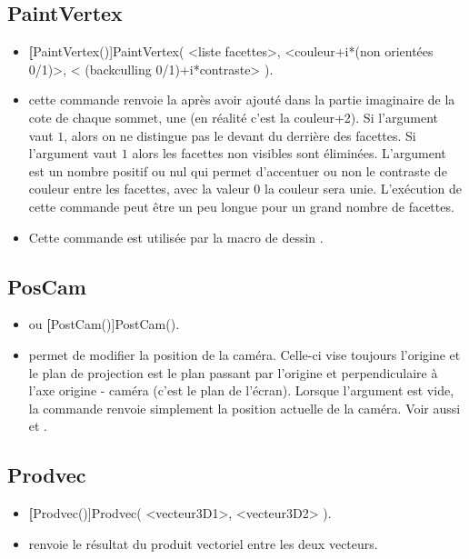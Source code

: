 \subsection{PaintVertex}\label{cmdPaintVertex}
\begin{itemize}
 \item \util \textbf[PaintVertex()]{PaintVertex( <liste facettes>, <couleur+i*(non orientées 0/1)>, < (backculling 0/1)+i*contraste> )}.
 \item \desc cette commande renvoie la  après avoir ajouté dans la partie imaginaire de la cote de chaque sommet, une  (en réalité c'est la couleur+2). Si l'argument  vaut $1$, alors on ne distingue pas le devant du derrière des facettes. Si l'argument  vaut $1$ alors les facettes non visibles sont éliminées. L'argument  est un nombre positif ou nul qui permet d'accentuer ou non le contraste de couleur entre les facettes, avec la valeur $0$ la couleur sera unie. L'exécution de cette commande peut être un peu longue pour un grand nombre de facettes.
 \item Cette commande est utilisée par la macro de dessin .
\end{itemize}


\subsection{PosCam}\label{cmdPosCam}

\begin{itemize}
 \item \util {} ou \textbf[PostCam()]{PostCam()}.
 \item \desc permet de modifier la position de la caméra. Celle-ci vise toujours l'origine et le plan de projection est le plan passant par l'origine et perpendiculaire à l'axe origine - caméra (c'est le plan de l'écran). Lorsque l'argument est vide, la commande renvoie simplement la position actuelle de la caméra. Voir aussi  et .
\end{itemize}


\subsection{Prodvec}
\begin{itemize}
 \item \util \textbf[Prodvec()]{Prodvec( <vecteur3D1>, <vecteur3D2> )}.
 \item \desc renvoie le résultat du produit vectoriel entre les deux vecteurs.
\end{itemize}

